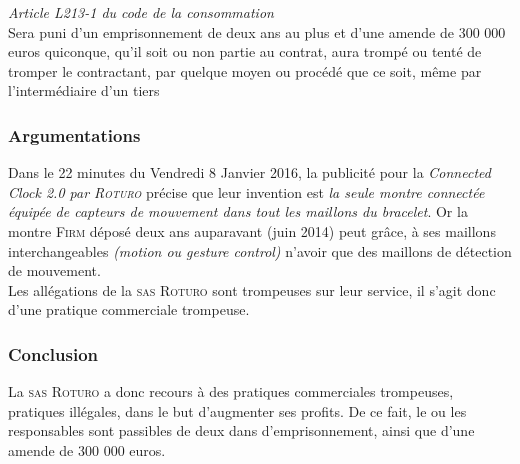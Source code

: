 \textit{Article L213-1 du code de la consommation}\\
Sera puni d'un emprisonnement de deux ans au plus et d'une amende de 300 000 euros quiconque, qu'il soit ou non partie au contrat, aura trompé ou tenté de tromper le contractant, par quelque moyen ou procédé que ce soit, même par l'intermédiaire d'un tiers\\
\subsubsection{Argumentations}
Dans le 22 minutes du Vendredi 8 Janvier 2016, la publicité pour la \emph{Connected Clock 2.0 par \textsc{Roturo}} précise que leur invention est \emph{la seule montre connectée équipée de capteurs de mouvement dans tout les maillons du bracelet}. Or la montre \textsc{Firm} déposé deux ans auparavant (juin 2014) peut grâce, à ses maillons interchangeables \emph{(motion ou gesture control)} n'avoir que des maillons de détection de mouvement. \\
Les allégations de la \textsc{sas Roturo} sont trompeuses sur leur service, il s'agit donc d'une  pratique commerciale trompeuse.
\subsubsection{Conclusion}
La \textsc{sas Roturo} a donc recours à des pratiques commerciales trompeuses, pratiques illégales, dans le but d'augmenter ses profits. De ce fait, le ou les responsables sont passibles de deux dans d'emprisonnement, ainsi que d'une amende de 300 000 euros.
